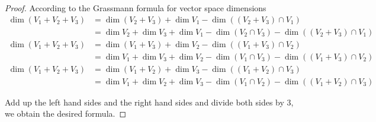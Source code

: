 \begin{proof}
    According to the Grassmann formula for vector space dimensions
    \begin{align*}
        \dim (V_{1} + V_{2} + V_{3}) & = \dim (V_{2} + V_{3}) + \dim V_{1} - \dim ((V_{2} + V_{3})\cap V_{1})                             \\
                                     & = \dim V_{2} + \dim V_{3} + \dim V_{1} - \dim (V_{2}\cap V_{3}) - \dim ((V_{2} + V_{3})\cap V_{1}) \\
        \dim (V_{1} + V_{2} + V_{3}) & = \dim (V_{1} + V_{3}) + \dim V_{2} - \dim ((V_{1} + V_{3})\cap V_{2})                             \\
                                     & = \dim V_{1} + \dim V_{3} + \dim V_{2} - \dim (V_{1}\cap V_{3}) - \dim ((V_{1} + V_{3})\cap V_{2}) \\
        \dim (V_{1} + V_{2} + V_{3}) & = \dim (V_{1} + V_{2}) + \dim V_{3} - \dim ((V_{1} + V_{2})\cap V_{3})                             \\
                                     & = \dim V_{1} + \dim V_{2} + \dim V_{3} - \dim (V_{1}\cap V_{2}) - \dim ((V_{1} + V_{2})\cap V_{3})
    \end{align*}

    Add up the left hand sides and the right hand sides and divide both sides by $3$, we obtain the desired formula.
\end{proof}

